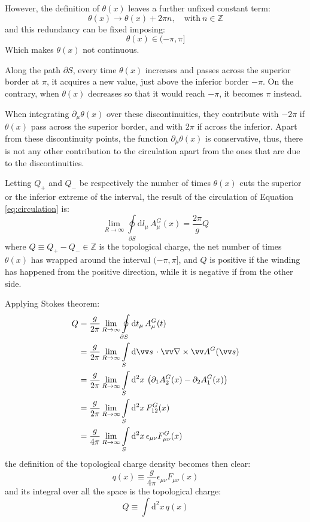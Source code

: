 However, the definition of $\theta(x)$ leaves a further unfixed constant term:
\[
    \theta(x) \rightarrow \theta(x) + 2\pi n, \quad \text{with}\ n \in \mathbb Z
\]
and this redundancy can be fixed imposing:
\[
    \theta(x) \in (-\pi,\pi]
\]
Which makes $\theta(x)$ not continuous.

Along the path $\partial S$, every time $\theta(x)$ increases and passes across the superior border at $\pi$, it acquires a new value,
just above the inferior border $-\pi$.
On the contrary, when $\theta(x)$ decreases so that it would reach $-\pi$, it becomes $\pi$ instead.

When integrating $\partial_\mu\theta(x)$ over these discontinuities,
they contribute with $-2\pi$ if $\theta(x)$ pass across the superior border, and with $2\pi$ if across the inferior.
Apart from these discontinuity points, the function $\partial_\mu\theta(x)$ is conservative, thus,
there is not any other contribution to the circulation apart from the ones that are due to the discontinuities.

Letting $Q_+$ and $Q_-$ be respectively the number of times $\theta(x)$ cuts the superior or the inferior extreme of the interval,
the result of the circulation of Equation \eqref{eq:circulation} is:
\[
    \lim_{R\to\infty}\oint\limits_{\partial S}\mathrm dl_\mu\,A^G_\mu(x) = \frac{2\pi}{g} Q
\]
where $Q \equiv Q_+ - Q_- \in \mathbb Z$ is the topological charge, \ie the net number of times $\theta(x)$ has wrapped around the interval $(-\pi,\pi]$,
and $Q$ is positive if the winding has happened from the positive direction, while it is negative if from the other side.

Applying Stokes theorem:
\begin{align*}
    Q &= \frac{g}{2\pi}\lim_{R\to\infty}\oint\limits_{\partial S}\mathrm dt_\mu\,A^G_\mu(t) \\
      &= \frac{g}{2\pi}\lim_{R\to\infty}\int\limits_S\mathrm d\vv s\,\cdot \vv\nabla \times \vv A^G(\vv s) \\
      &= \frac{g}{2\pi}\lim_{R\to\infty}\int\limits_S\mathrm d^2x\, \left(\partial_1 A^G_2(x) - \partial_2 A^G_1(x)\right) \\
      &= \frac{g}{2\pi}\lim_{R\to\infty}\int\limits_S\mathrm d^2x\, F^G_{12}(x) \\
      &= \frac{g}{4\pi}\lim_{R\to\infty}\int\limits_S\mathrm d^2x\, \epsilon_{\mu\nu}F^G_{\mu\nu}(x)
\end{align*}
the definition of the topological charge density becomes then clear:
\begin{equation}\label{eq:top_charge_density}
    q(x) \equiv \frac{g}{4\pi}\epsilon_{\mu\nu}F_{\mu\nu}(x)
\end{equation}
and its integral over all the space is the topological charge:
\begin{equation}\label{eq:top_charge}
    Q \equiv \int\mathrm d^2x\,q(x)
\end{equation}

